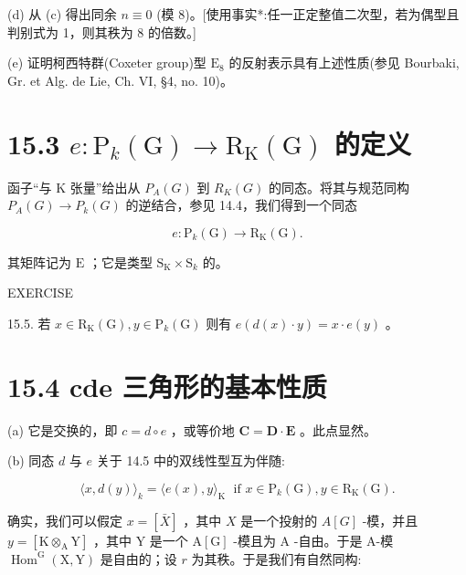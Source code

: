\documentclass[10pt]{article}
\begin{document}
(d) 从 (c) 得出同余 \(n \equiv  0\) (模 8)。[使用事实*:任一正定整值二次型，若为偶型且判别式为 1，则其秩为 8 的倍数。]

(e) 证明柯西特群(Coxeter group)型 \({\mathrm{E}}_{8}\) 的反射表示具有上述性质(参见 Bourbaki, Gr. et Alg. de Lie, Ch. VI, §4, no. 10)。

\section*{15.3 \(e : {\mathrm{P}}_{k}\left( \mathrm{G}\right)  \rightarrow  {\mathrm{R}}_{\mathrm{K}}\left( \mathrm{G}\right)\) 的定义}

函子“与 \(\mathrm{K}\) 张量”给出从 \({P}_{A}\left( G\right)\) 到 \({R}_{K}\left( G\right)\) 的同态。将其与规范同构 \({P}_{A}\left( G\right)  \rightarrow  {P}_{k}\left( G\right)\) 的逆结合，参见 14.4，我们得到一个同态

\[
e : {\mathrm{P}}_{k}\left( \mathrm{G}\right)  \rightarrow  {\mathrm{R}}_{\mathrm{K}}\left( \mathrm{G}\right) .
\]

其矩阵记为 \(\mathrm{E}\) ；它是类型 \({\mathrm{S}}_{\mathrm{K}} \times  {\mathrm{S}}_{k}\) 的。

EXERCISE

15.5. 若 \(x \in  {\mathrm{R}}_{\mathrm{K}}\left( \mathrm{G}\right) ,y \in  {\mathrm{P}}_{k}\left( \mathrm{G}\right)\) 则有 \(e\left( {d\left( x\right)  \cdot  y}\right)  = x \cdot  e\left( y\right)\) 。

\section*{15.4 cde 三角形的基本性质}

(a) 它是交换的，即 \(c = d \circ  e\) ，或等价地 \(\mathbf{C} = \mathbf{D} \cdot  \mathbf{E}\) 。此点显然。

(b) 同态 \(d\) 与 \(e\) 关于 14.5 中的双线性型互为伴随:

\[
\langle x,d\left( y\right) {\rangle }_{k} = \langle e\left( x\right) ,y{\rangle }_{\mathrm{K}}\;\text{ if }x \in  {\mathrm{P}}_{k}\left( \mathrm{G}\right) ,y \in  {\mathrm{R}}_{\mathrm{K}}\left( \mathrm{G}\right) .
\]

确实，我们可以假定 \(x = \left\lbrack  \bar{X}\right\rbrack\) ，其中 \(X\) 是一个投射的 \(A\left\lbrack  G\right\rbrack\) -模，并且 \(y = \left\lbrack  {\mathrm{K}{ \otimes  }_{\mathrm{A}}\mathrm{Y}}\right\rbrack\) ，其中 \(\mathrm{Y}\) 是一个 \(\mathrm{A}\left\lbrack  \mathrm{G}\right\rbrack\) -模且为 \(\mathrm{A}\) -自由。于是 A-模 \({\operatorname{Hom}}^{\mathrm{G}}\left( {\mathrm{X},\mathrm{Y}}\right)\) 是自由的；设 \(r\) 为其秩。于是我们有自然同构:
\end{document}
